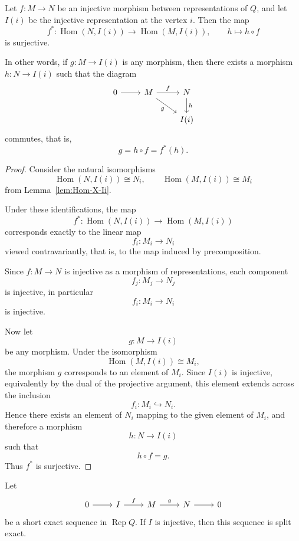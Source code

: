 \documentclass[11pt, a4paper]{report}
\begin{document}
\begin{proposition}\label{prop:injective-lifting}
    Let $f:M\to N$ be an injective morphism between representations of $Q$, and let $I(i)$ be the injective representation at the vertex $i$. Then the map
    \[
        f^*:\operatorname{Hom}(N,I(i))\longrightarrow \operatorname{Hom}(M,I(i)),
        \qquad h\longmapsto h\circ f
    \]
    is surjective.

    In other words, if $g:M\to I(i)$ is any morphism, then there exists a morphism
    $h:N\to I(i)$ such that the diagram
    \[
        \begin{tikzcd}
            0 \arrow[r] & M \arrow[r, "f"] \arrow[dr, "g"'] & N \arrow[d, "h"] \\
            & & I(i)
        \end{tikzcd}
    \]
    commutes, that is,
    \[
        g=h\circ f=f^*(h).
    \]
\end{proposition}

\begin{proof}
    Consider the natural isomorphisms
    \[
        \operatorname{Hom}(N,I(i))\cong N_i,
        \qquad
        \operatorname{Hom}(M,I(i))\cong M_i
    \]
    from Lemma~\ref{lem:Hom-X-Ii}.

    Under these identifications, the map
    \[
        f^*:\operatorname{Hom}(N,I(i))\to \operatorname{Hom}(M,I(i))
    \]
    corresponds exactly to the linear map
    \[
        f_i:M_i\to N_i
    \]
    viewed contravariantly, that is, to the map induced by precomposition.

    Since $f:M\to N$ is injective as a morphism of representations, each component
    \[
        f_j:M_j\to N_j
    \]
    is injective, in particular
    \[
        f_i:M_i\to N_i
    \]
    is injective.

    Now let
    \[
        g:M\to I(i)
    \]
    be any morphism. Under the isomorphism
    \[
        \operatorname{Hom}(M,I(i))\cong M_i,
    \]
    the morphism $g$ corresponds to an element of $M_i$. Since $I(i)$ is injective, equivalently by the dual of the projective argument, this element extends across the inclusion
    \[
        f_i:M_i\hookrightarrow N_i.
    \]
    Hence there exists an element of $N_i$ mapping to the given element of $M_i$, and therefore a morphism
    \[
        h:N\to I(i)
    \]
    such that
    \[
        h\circ f=g.
    \]
    Thus $f^*$ is surjective.
\end{proof}

\begin{corollary}\label{cor:short-exact-injective-splits}
    Let
    \[
        \begin{tikzcd}
            0 \arrow[r] & I \arrow[r, "f"] & M \arrow[r, "g"] & N \arrow[r] & 0
        \end{tikzcd}
    \]
    be a short exact sequence in $\operatorname{Rep}Q$. If $I$ is injective, then this sequence is split exact.
\end{corollary}
\end{document}
